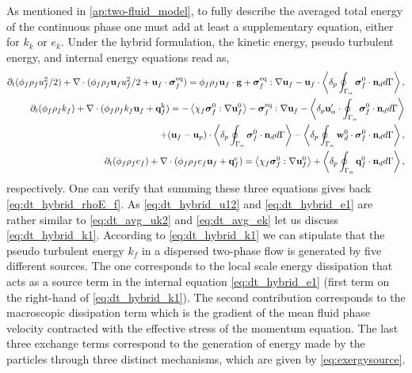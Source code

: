 As mentioned in \ref{ap:two-fluid_model}, to fully describe the averaged total energy of the continuous phase one must add at least a supplementary equation, either for $k_k$ or $e_k$.  
Under the hybrid formulation, the kinetic energy, pseudo turbulent energy, and internal energy equations read as,
\begin{align}
    \pddt (\phi_f \rho_fu_f^2/2)  
    + \div (
        \phi_f \rho_f\textbf{u}_fu_f^2/2
        + \textbf{u}_f \cdot \bm{\sigma}_f^\text{eq}
    )
    = 
    \phi_f \rho_f \textbf{u}_f\cdot \textbf{g} 
    + \bm{\sigma}_f^\text{eq} : \grad \textbf{u}_f
    -  \textbf{u}_f\cdot 
        \pSavg{{\bm{\sigma}_f^0 \cdot \textbf{n}_d}},
        \label{eq:dt_hybrid_u12}
        \\
    \label{eq:dt_hybrid_k1}
    \pddt (\phi_f\rho_fk_f)  
    + \div (
        \phi_f\rho_fk_f\textbf{u}_f
        + \textbf{q}_f^\text{k} 
        )
    = 
    - \avg{\chi_f\bm{\sigma}_f^0 : \grad \textbf{u}_f^0}
    - \bm{\sigma}_f^\text{eq} : \grad \textbf{u}_f\nonumber
    - \pavg{ \textbf{u}_\alpha' \cdot \intS{  \bm{\sigma}_f^0 \cdot \textbf{n}_d}}\\
    + (\textbf{u}_f - \textbf{u}_p)\cdot \pSavg{{\bm{\sigma}_f^0 \cdot \textbf{n}_d}} 
    - \pavg{ \intS{\textbf{w}_d^0 \cdot \bm{\sigma}_f^0 \cdot \textbf{n}_d}},
    \\
    \label{eq:dt_hybrid_e1}
    \pddt (\phi_f\rho_fe_f)  
    + \div (
        \phi_f \rho_fe_f\textbf{u}_f
        +
        \textbf{q}_f^\text{e} 
        )
    = 
    \avg{\chi_f\bm{\sigma}_f^0 : \grad \textbf{u}_f^0}
    + \pSavg{{\textbf{q}_f^0 \cdot \textbf{n}_d}},
\end{align}
respectively. 
One can verify that summing these three equations gives back \ref{eq:dt_hybrid_rhoE_f}. 
As \ref{eq:dt_hybrid_u12} and \ref{eq:dt_hybrid_e1} are rather similar to \ref{eq:dt_avg_uk2} and \ref{eq:dt_avg_ek} let us discuss \ref{eq:dt_hybrid_k1}. 
According to  \ref{eq:dt_hybrid_k1} we can stipulate that the pseudo turbulent energy $k_f$ in a dispersed two-phase flow is generated by five different sources. 
The one corresponds to the local scale energy dissipation that acts as a source term in the internal equation \eqref{eq:dt_hybrid_e1} (first term on the right-hand of \ref{eq:dt_hybrid_k1}). 
The second contribution corresponds to the macroscopic dissipation term which is the gradient of the mean fluid phase velocity contracted with the effective stress of the momentum equation.  
The last three exchange terms correspond to the generation of energy made by the particles through three distinct mechanisms, which are given by \ref{eq:exergysource}. 
